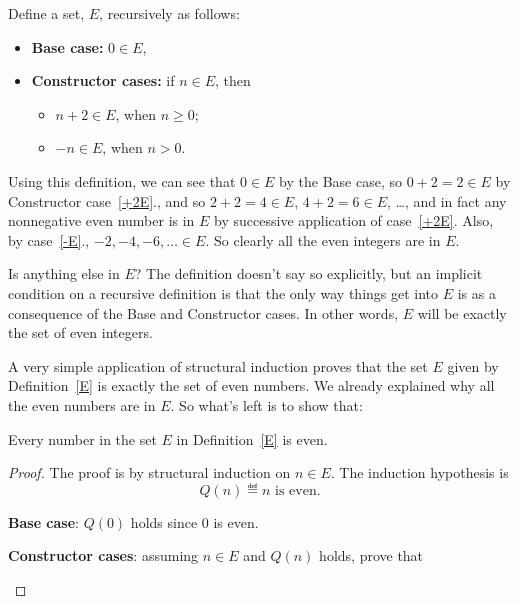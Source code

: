 \begin{definition}
\begin{staffnotes}

\begin{example*}
\begin{definition}\label{E}
Define a set, $E$, recursively as follows:
\begin{itemize}
\item \textbf{Base case:} $0 \in E$,\label{0E}
\item \textbf{Constructor cases:} if $n \in E$, then
\begin{itemize}
\item $n+2 \in E$, when $n\geq 0$;\label{+2E}
\item $-n \in E$, when $n > 0$.\label{-E}
\end{itemize}
\end{itemize}

\end{definition}
\end{example*}

Using this definition, we can see that $0 \in E$ by the Base case, so $0 +
2 = 2 \in E$ by Constructor case~\ref{+2E}., and so $2+2 =4 \in E$, $4+2 =
6 \in E$, \dots, and in fact any nonnegative even number is in $E$ by
successive application of case~\ref{+2E}.  Also, by case~\ref{-E}.,
$-2,-4,-6,\dots \in E$.  So clearly all the even integers are in $E$.

Is anything else in $E$?  The definition doesn't say so explicitly, but an
implicit condition on a recursive definition is that the only way things
get into $E$ is as a consequence of the Base and Constructor cases.  In
other words, $E$ will be exactly the set of even integers.

A very simple application of structural induction proves that the set $E$
given by Definition~\ref{E} is exactly the set of even numbers.  We already
explained why all the even numbers are in $E$.  So what's left is to show
that:

\begin{lemma*}
Every number in the set $E$ in Definition~\ref{E} is even.
\begin{proof}
The proof is by structural induction on $n \in E$.  The induction
hypothesis is 
\[
Q(n) \eqdef \text{$n$ is even}.
\]

\textbf{Base case}: $Q(0)$ holds since 0 is even.

\textbf{Constructor cases}: assuming $n \in E$ and $Q(n)$ holds, prove
that
\begin{itemize}


\end{itemize}
\end{proof}
\end{lemma*}
\end{staffnotes}
\end{definition}
